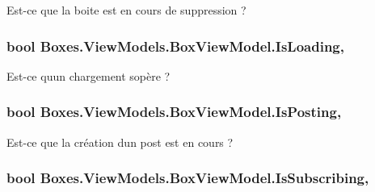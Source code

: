 Est-\/ce que la boite est en cours de suppression ? 

\subsubsection[{\texorpdfstring{Is\+Loading}{IsLoading}}]{\setlength{\rightskip}{0pt plus 5cm}bool Boxes.\+View\+Models.\+Box\+View\+Model.\+Is\+Loading\hspace{0.3cm}{\ttfamily [get]}, {\ttfamily [set]}}\hypertarget{class_boxes_1_1_view_models_1_1_box_view_model_a95c46ef0aac77f708e05826d159b0ff8}{}\label{class_boxes_1_1_view_models_1_1_box_view_model_a95c46ef0aac77f708e05826d159b0ff8}


Est-\/ce qu\textquotesingle{}un chargement s\textquotesingle{}opère ? 

\subsubsection[{\texorpdfstring{Is\+Posting}{IsPosting}}]{\setlength{\rightskip}{0pt plus 5cm}bool Boxes.\+View\+Models.\+Box\+View\+Model.\+Is\+Posting\hspace{0.3cm}{\ttfamily [get]}, {\ttfamily [set]}}\hypertarget{class_boxes_1_1_view_models_1_1_box_view_model_aebe8ce493cf812cceed6e4fcf715486f}{}\label{class_boxes_1_1_view_models_1_1_box_view_model_aebe8ce493cf812cceed6e4fcf715486f}


Est-\/ce que la création d\textquotesingle{}un post est en cours ? 

\subsubsection[{\texorpdfstring{Is\+Subscribing}{IsSubscribing}}]{\setlength{\rightskip}{0pt plus 5cm}bool Boxes.\+View\+Models.\+Box\+View\+Model.\+Is\+Subscribing\hspace{0.3cm}{\ttfamily [get]}, {\ttfamily [set]}}\hypertarget{class_boxes_1_1_view_models_1_1_box_view_model_a2e5d1c7c2e548e38a46529c9fe4ee765}{}\label{class_boxes_1_1_view_models_1_1_box_view_model_a2e5d1c7c2e548e38a46529c9fe4ee765}


